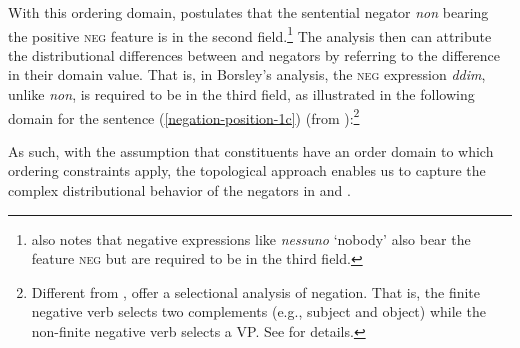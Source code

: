 \documentclass[output=paper
 	        ,biblatex
                ,babelshorthands
                ,newtxmath
                ,draftmode
                ,colorlinks, citecolor=brown
]{langscibook}
\begin{document}
\begin{exe}
\begin{xlist}
\ea
{}
\z
%
With this ordering domain, \citet{Borsley:06} postulates
that the  sentential negator \emph{non} bearing the positive \textsc{neg} feature is in the second field.\footnote{
\citet{Borsley:06} also notes that  negative expressions like \emph{nessuno} `nobody' also bear the feature \textsc{neg}
but are required to be in the third field.}
The analysis then can attribute the distributional differences between  and  negators
by referring to the difference in their domain value. That is,
in Borsley's analysis, the  \textsc{neg} expression \emph{ddim}, unlike  \emph{non},
is required to be in the third field, as illustrated in the following domain for the sentence (\ref{negation-position-1c}) (from
\citealt[]{Borsley:06}):\footnote{Different from \citet{Borsley:06}, \citet{BJ:00} offer  a selectional analysis of  negation.
That is, the finite negative verb selects
two complements (e.g., subject and object) while
the non-finite negative verb selects a VP. See \citet{BJ:00} for details.}

\ea
{}
\z
As such,  with the assumption that constituents have an order domain to which ordering
constraints apply, the topological approach enables us to capture the complex distributional
behavior of the negators in  and .
%




\end{xlist}
\end{exe}
\end{document}
